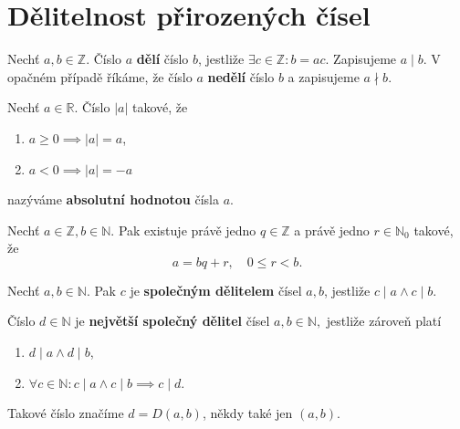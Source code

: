 \section{Dělitelnost přirozených čísel}
\begin{definition}
  Nechť $a,b\in\mathbb Z.$ Číslo $a$ \textbf{dělí} číslo $b$, jestliže $\exists c \in \mathbb{Z}\colon b=ac$. Zapisujeme $a \mid b$.
  V opačném případě říkáme, že číslo $a$ \textbf{nedělí} číslo $b$ a zapisujeme $a \nmid b$.
\end{definition}

\begin{definition}
  Nechť $a\in \mathbb R$. Číslo $|a|$ takové, že
  \begin{enumerate}[$i.$]
    \item $a\geq 0 \implies |a| = a$,
    \item $a<0 \implies |a| = - a$
  \end{enumerate}
  nazýváme \textbf{absolutní hodnotou} čísla $a$.
\end{definition}

\begin{veta}
  Nechť $a\in \mathbb Z, b\in \mathbb N.$ Pak existuje právě jedno $q \in \mathbb Z$ a právě jedno $r\in \mathbb N_0$ takové, že
  $$a=bq+r,\quad 0 \leq r < b.$$
\end{veta}

\begin{definition}
  Nechť $a,b\in \mathbb N$. Pak $c$ je \textbf{společným dělitelem} čísel $a,b$, jestliže $c \mid a \land c\mid b.$
\end{definition}

\begin{definition}
  Číslo $d\in \mathbb N$ je \textbf{největší společný dělitel} čísel $a,b \in \mathbb N,$ jestliže zároveň platí
  \begin{enumerate}[$i.$]
    \item $d\mid a \land d \mid b$,
    \item $\forall c \in \mathbb N\colon c \mid a \land c \mid b \implies c \mid d.$
  \end{enumerate}
  Takové číslo značíme $d=D(a,b)$, někdy také jen $(a,b)$.
\end{definition}

